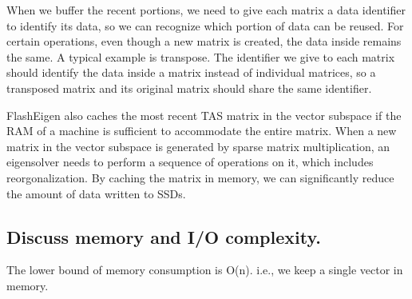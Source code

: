When we buffer the recent portions, we need to give each matrix a data identifier
to identify its data, so we can recognize which portion of data can be reused.
For certain operations, even though a new matrix is created, the data inside
remains the same. A typical example is transpose. The identifier we give to
each matrix should identify the data inside a matrix instead of individual matrices,
so a transposed matrix and its original matrix should share the same identifier.

FlashEigen also caches the most recent TAS matrix in the vector subspace if
the RAM of a machine is sufficient to accommodate the entire matrix.
When a new matrix in the vector subspace is generated by sparse matrix
multiplication, an eigensolver needs to perform a sequence of operations on it,
which includes reorgonalization. By caching the matrix in memory, we can
significantly reduce the amount of data written to SSDs.

\subsection{Discuss memory and I/O complexity.}
The lower bound of memory consumption is O(n). i.e., we keep a single vector
in memory.
